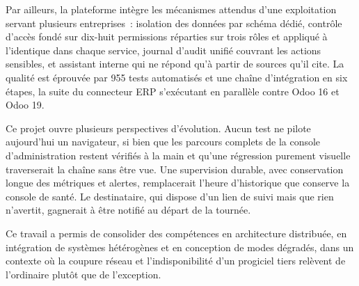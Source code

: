 Par ailleurs, la plateforme intègre les mécanismes attendus d'une exploitation servant plusieurs
entreprises~: isolation des données par schéma dédié, contrôle d'accès fondé sur dix-huit
permissions réparties sur trois rôles et appliqué à l'identique dans chaque service, journal d'audit
unifié couvrant les actions sensibles, et assistant interne qui ne répond qu'à partir de sources
qu'il cite. La qualité est éprouvée par 955 tests automatisés et une chaîne d'intégration en six
étapes, la suite du connecteur ERP s'exécutant en parallèle contre Odoo 16 et Odoo 19.

Ce projet ouvre plusieurs perspectives d'évolution. Aucun test ne pilote aujourd'hui un navigateur,
si bien que les parcours complets de la console d'administration restent vérifiés à la main et
qu'une régression purement visuelle traverserait la chaîne sans être vue. Une supervision durable,
avec conservation longue des métriques et alertes, remplacerait l'heure d'historique que conserve la
console de santé. Le destinataire, qui dispose d'un lien de suivi mais que rien n'avertit, gagnerait
à être notifié au départ de la tournée.

Ce travail a permis de consolider des compétences en architecture distribuée, en intégration de
systèmes hétérogènes et en conception de modes dégradés, dans un contexte où la coupure réseau et
l'indisponibilité d'un progiciel tiers relèvent de l'ordinaire plutôt que de l'exception.

\clearpage
